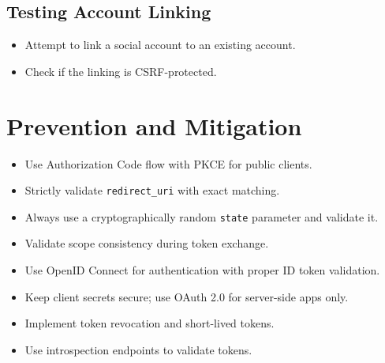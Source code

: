 \documentclass[12pt,a4paper]{article}
\begin{document}
\subsection{Testing Account Linking}
\begin{itemize}
    \item Attempt to link a social account to an existing account.
    \item Check if the linking is CSRF-protected.
\end{itemize}

\section{Prevention and Mitigation}
\begin{itemize}
    \item Use Authorization Code flow with PKCE for public clients.
    \item Strictly validate \texttt{redirect\_uri} with exact matching.
    \item Always use a cryptographically random \texttt{state} parameter and validate it.
    \item Validate scope consistency during token exchange.
    \item Use OpenID Connect for authentication with proper ID token validation.
    \item Keep client secrets secure; use OAuth 2.0 for server-side apps only.
    \item Implement token revocation and short-lived tokens.
    \item Use introspection endpoints to validate tokens.
\end{itemize}
\end{document}
